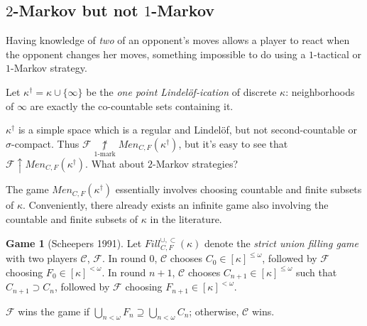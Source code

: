 \documentclass{beamer}
\theoremstyle{definition}
\newtheorem{game}[theorem]{Game}
\newcommand{\win}{\uparrow}
\newcommand{\notkmarkwin}[1]{\underset{#1\text{-mark}}{\not\uparrow}}
\newcommand{\oneptlind}[1]{#1^\dagger}
\newcommand{\mengame}[1]{Men_{C,F}(#1)}
\newcommand{\fillgameS}[1]{Fill^{\cup,\subset}_{C,F}(#1)}
\newcommand{\<}{\langle}
\renewcommand{\>}{\rangle}
\newcommand{\pl}[1]{\mathscr{#1}}
\newcommand{\term}{\textit}
\begin{document}
\subsection{$2$-Markov but not $1$-Markov}

\begin{frame}
  Having knowledge of \textit{two} of an opponent's moves allows a player to
  react when the opponent changes her moves, something impossible to do
  using a $1$-tactical or $1$-Markov strategy.

  \pause

  \begin{definition}
    Let $\oneptlind\kappa = \kappa\cup\{\infty\}$ be the
    \term{one point Lindel\"of-ication} of discrete $\kappa$: neighborhoods
    of $\infty$ are exactly the co-countable sets containing it.
  \end{definition}

  \pause

  $\oneptlind\kappa$ is a simple space which is a regular and Lindel\"of, but
  not second-countable or $\sigma$-compact. Thus
  $\pl F\notkmarkwin{1}\mengame{\oneptlind\kappa}$, but it's easy to see
  that $\pl F\win\mengame{\oneptlind\kappa}$. What about $2$-Markov
  strategies?
\end{frame}

\begin{frame}
  The game $\mengame{\oneptlind\kappa}$ essentially involves choosing
  countable and finite subsets of $\kappa$.
  Conveniently, there already exists an
  infinite game also involving the countable and finite subsets of
  $\kappa$ in the literature.

  \pause

  \begin{game}[Scheepers 1991]
    Let $\fillgameS\kappa$ denote the \term{strict union filling game}
    with two players $\pl C$, $\pl F$. In round $0$, $\pl C$ chooses
    $C_0\in[\kappa]^{\leq\omega}$, followed by $\pl F$ choosing
    $F_0\in[\kappa]^{<\omega}$. In round $n+1$, $\pl C$ chooses
    $C_{n+1}\in[\kappa]^{\leq\omega}$ such that $C_{n+1}\supset C_n$, followed
    by $\pl F$ choosing $F_{n+1}\in[\kappa]^{<\omega}$.

    $\pl F$ wins the game if
    $\bigcup_{n<\omega} F_n\supseteq\bigcup_{n<\omega} C_n$; otherwise, $\pl C$
    wins.
  \end{game}
\end{frame}
\end{document}
